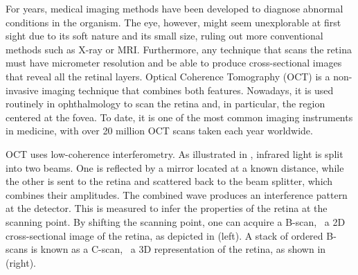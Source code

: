 
For years, medical imaging methods have been developed to diagnose abnormal conditions in the organism. The eye, however, might seem unexplorable at first sight due to its soft nature and its small size, ruling out more conventional methods such as X-ray or MRI. Furthermore, any technique that scans the retina must have micrometer resolution and be able to produce cross-sectional images that reveal all the retinal layers. Optical Coherence Tomography (OCT) is a non-invasive imaging technique that combines both features. Nowadays, it is used routinely in ophthalmology to scan the retina and, in particular, the region centered at the fovea. To date, it is one of the most common imaging instruments in medicine, with over 20 million OCT scans taken each year worldwide.

OCT uses low-coherence interferometry. As illustrated in , infrared light is split into two beams. One is reflected by a mirror located at a known distance, while the other is sent to the retina and scattered back to the beam splitter, which combines their amplitudes. The combined wave produces an interference pattern at the detector. This is measured to infer the properties of the retina at the scanning point. By shifting the scanning point, one can acquire a B-scan, \ie~a 2D cross-sectional image of the retina, as depicted in  (left). A stack of ordered B-scans is known as a C-scan, \ie~a 3D representation of the retina, as shown in  (right).


